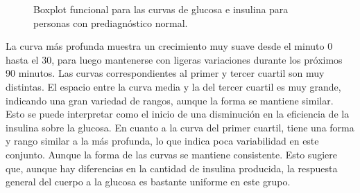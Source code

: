 \begin{figure}[H]
 \centering
    \caption{Boxplot funcional para las curvas de glucosa e insulina para personas con prediagnóstico normal.}
    \label{fig:bfNormal}
\end{figure}

La curva más profunda muestra un crecimiento muy suave desde el minuto 0 hasta el 30, para luego mantenerse con ligeras variaciones durante los próximos 90 minutos. Las curvas correspondientes al primer y tercer cuartil son muy distintas. El espacio entre la curva media y la del tercer cuartil es muy grande, indicando una gran variedad de rangos, aunque la forma se mantiene similar. Esto se puede interpretar como el inicio de una disminución en la eficiencia de la insulina sobre la glucosa. En cuanto a la curva del primer cuartil, tiene una forma y rango similar a la más profunda, lo que indica poca variabilidad en este conjunto. Aunque la forma de las curvas se mantiene consistente. Esto sugiere que, aunque hay diferencias en la cantidad de insulina producida, la respuesta general del cuerpo a la glucosa es bastante uniforme en este grupo.


